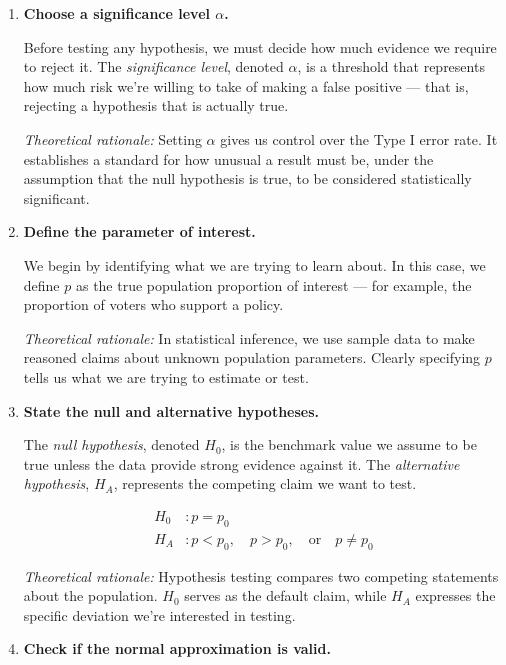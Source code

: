 \documentclass[11pt]{article}
\begin{document}
\begin{enumerate}[label=\textbf{Step \arabic*:}, leftmargin=2.5em]

\item \textbf{Choose a significance level $\alpha$.}

Before testing any hypothesis, we must decide how much evidence we require to reject it. The \textit{significance level}, denoted $\alpha$, is a threshold that represents how much risk we're willing to take of making a false positive — that is, rejecting a hypothesis that is actually true.

\textit{Theoretical rationale:} Setting $\alpha$ gives us control over the Type I error rate. It establishes a standard for how unusual a result must be, under the assumption that the null hypothesis is true, to be considered statistically significant.

\vspace{0.5em}
\item \textbf{Define the parameter of interest.}

We begin by identifying what we are trying to learn about. In this case, we define $p$ as the true population proportion of interest — for example, the proportion of voters who support a policy.

\textit{Theoretical rationale:} In statistical inference, we use sample data to make reasoned claims about unknown population parameters. Clearly specifying $p$ tells us what we are trying to estimate or test.

\vspace{0.5em}
\item \textbf{State the null and alternative hypotheses.}

The \textit{null hypothesis}, denoted $H_0$, is the benchmark value we assume to be true unless the data provide strong evidence against it. The \textit{alternative hypothesis}, $H_A$, represents the competing claim we want to test.

\begin{align*}
H_0 &: p = p_0 \\
H_A &: p < p_0, \quad p > p_0, \quad \text{or} \quad p \neq p_0
\end{align*}

\textit{Theoretical rationale:} Hypothesis testing compares two competing statements about the population. $H_0$ serves as the default claim, while $H_A$ expresses the specific deviation we're interested in testing.

\vspace{0.5em}
\item \textbf{Check if the normal approximation is valid.}


\end{enumerate}
\end{document}
